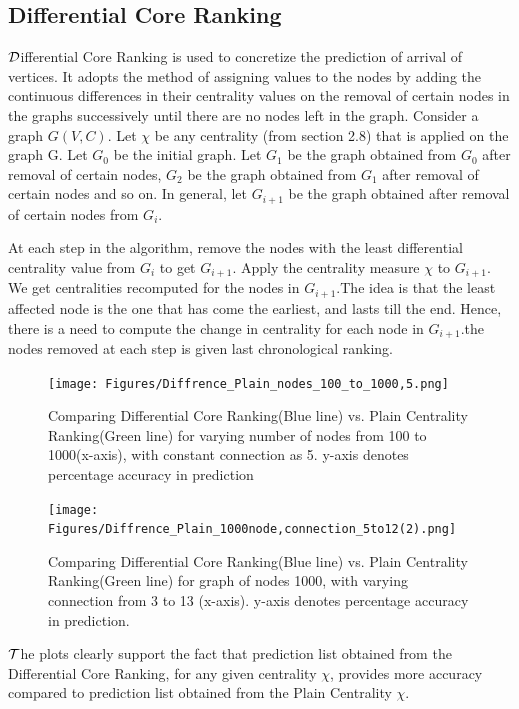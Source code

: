 \documentclass{article}
\begin{document}
\subsection{Differential Core Ranking}
\hspace{.18in}$\cal D$ifferential Core Ranking is used to concretize the prediction of arrival of vertices. It adopts the method of assigning values to the nodes by adding the continuous differences in their centrality values on the removal of certain nodes in the graphs successively until there are no nodes left in the graph. Consider a graph $G(V,C)$. Let $\chi$ be any centrality (from section 2.8) that is applied on the graph G. Let $G_0$ be the initial graph. Let $G_1$ be the graph obtained from $G_0$ after removal of certain nodes, $G_2$ be the graph obtained from $G_1$ after removal of certain nodes and so on. In general, let $G_{i+1}$ be the graph obtained after removal of certain nodes from $G_i$.

At each step in the algorithm, remove the nodes with the least differential centrality value from $G_i$ to get $G_{i+1}$. Apply the centrality measure $\chi$ to $G_{i+1}$. We get centralities recomputed for the nodes in $G_{i+1}$.The idea is that the least affected node is the one that has come the earliest, and lasts till the end. Hence, there is a need to compute the change in centrality for each node in $G_{i+1}$.the nodes removed at each step is given last chronological ranking.

\begin{figure}[htp]
\centering
\texttt{[image: Figures/Diffrence\_Plain\_nodes\_100\_to\_1000,5.png]}
\caption{Comparing Differential Core Ranking(Blue line) vs. Plain Centrality Ranking(Green line) for varying number of nodes from 100 to 1000(x-axis), with constant connection as 5. y-axis denotes percentage accuracy in prediction}
\label{}
\end{figure}

\begin{figure}[htp]
\centering
\texttt{[image: Figures/Diffrence\_Plain\_1000node,connection\_5to12(2).png]}
\caption{Comparing Differential Core Ranking(Blue line) vs. Plain Centrality Ranking(Green line) for graph of nodes 1000, with varying connection from 3 to 13 (x-axis). y-axis denotes percentage accuracy in prediction.}
\label{}
\end{figure}

\newpage

$\cal T$he plots clearly support the fact that prediction list obtained from the Differential Core Ranking, for any given centrality $\chi$, provides more accuracy compared to prediction list obtained from the Plain Centrality $\chi$.
\end{document}
